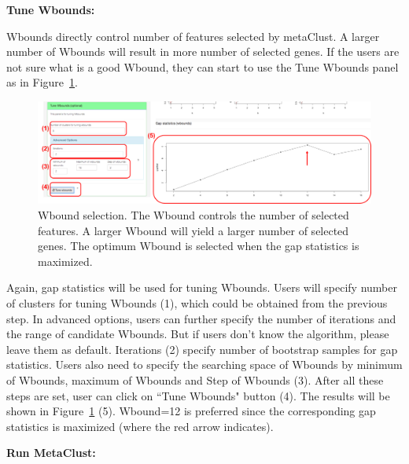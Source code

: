\begin{steps}
\item \textbf{Tune Wbounds:} 

Wbounds directly control number of features selected by metaClust.
A larger number of Wbounds will result in more number of selected genes.
If the users are not sure what is a good Wbound,
they can start to use the Tune Wbounds panel as in Figure~\ref{fig:metaClusttuneW}.
\begin{figure}[H]
\begin{center}
\includegraphics[scale=0.5]{./figure/metaClust/tuneW.pdf}
\caption{Wbound selection.
The Wbound controls the number of selected features.
A larger Wbound will yield a larger number of selected genes.
The optimum Wbound is selected when the gap statistics is maximized.
}
\label{fig:metaClusttuneW}
\end{center}
\end{figure}
Again,
gap statistics will be used for tuning Wbounds.
Users will specify number of clusters for tuning Wbounds {\color{red} (1)}, which could be obtained from the previous step.
In advanced options, users can further specify the number of iterations and the range of candidate Wbounds.
But if users don't know the algorithm, please leave them as default.
Iterations {\color{red} (2)} specify number of bootstrap samples for gap statistics.
Users also need to specify the searching space of Wbounds by minimum of Wbounds, maximum of Wbounds and Step of Wbounds {\color{red} (3)}.
After all these steps are set,
user can click on ``Tune Wbounds" button {\color{red} (4)}.
The results will be shown in Figure~\ref{fig:metaClusttuneW} {\color{red} (5)}.
Wbound=12 is preferred since the corresponding gap statistics is maximized (where the red arrow indicates).

\item \textbf{Run MetaClust:} 


\end{steps}
